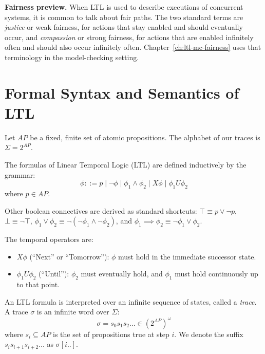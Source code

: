 \medskip\noindent
\textbf{Fairness preview.}
When LTL is used to describe executions of concurrent systems, it is common to talk about fair paths.  The two standard terms are \emph{justice} or weak fairness, for actions that stay enabled and should eventually occur, and \emph{compassion} or strong fairness, for actions that are enabled infinitely often and should also occur infinitely often.  Chapter~\ref{ch:ltl-mc-fairness} uses that terminology in the model-checking setting.

\section{Formal Syntax and Semantics of LTL}
\label{sec:ltl-formal}

Let $AP$ be a fixed, finite set of atomic propositions. The alphabet of our traces is $\Sigma = 2^{AP}$. 

\begin{definition}
\label{def:ltl-syntax}
The formulas of Linear Temporal Logic (LTL) are defined inductively by the grammar:
\[
  \phi ::= p \mid \neg \phi \mid \phi_1 \land \phi_2 \mid X \phi \mid \phi_1 U \phi_2
\]
where $p \in AP$.
\end{definition}

Other boolean connectives are derived as standard shortcuts: $\top \equiv p \lor \neg p$, $\bot \equiv \neg \top$, $\phi_1 \lor \phi_2 \equiv \neg(\neg\phi_1 \land \neg\phi_2)$, and $\phi_1 \implies \phi_2 \equiv \neg\phi_1 \lor \phi_2$.

The temporal operators are:
\begin{itemize}
    \item $X \phi$ (``Next'' or ``Tomorrow''): $\phi$ must hold in the immediate successor state.
    \item $\phi_1 U \phi_2$ (``Until''): $\phi_2$ must eventually hold, and $\phi_1$ must hold continuously up to that point.
\end{itemize}

An LTL formula is interpreted over an infinite sequence of states, called a \emph{trace}. A trace $\sigma$ is an infinite word over $\Sigma$:
\[
  \sigma = s_0 s_1 s_2 \dots \in (2^{AP})^\omega
\]
where $s_i \subseteq AP$ is the set of propositions true at step $i$. We denote the suffix $s_i s_{i+1} s_{i+2} \dots$ as $\sigma[i..]$.

